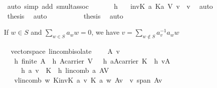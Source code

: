 \begin{isabellebody}
\ {\isacharparenleft}auto\ simp\ add{\isacharcolon}\ smult{\isacharunderscore}assoc{}{\isacharparenright}\isanewline
\ \ \ \ \isamarkupfalse%
\ {}\ h{}\ \isamarkupfalse%
\ {}{\isacharcolon}\ {\isachardoublequoteopen}{\isacharparenleft}inv\isactrlbsub K\isactrlesub \ a\ {\isasymotimes}\isactrlbsub K\isactrlesub a{\isacharparenright}\ {\isasymodot}\isactrlbsub V\isactrlesub \ v\ {\isacharequal}\ v{\isachardoublequoteclose}\ \isamarkupfalse%
\ auto\isanewline
\ \ \ \ \isamarkupfalse%
\ {}\ {}\ \isamarkupfalse%
\ {\isacharquery}thesis\ \isamarkupfalse%
\ auto\isanewline
\ \ \isamarkupfalse%
\isanewline
\ \ \isamarkupfalse%
\ {}\ {}\ \isamarkupfalse%
\ {\isacharquery}thesis\ \isamarkupfalse%
\ auto\isanewline
{}\isamarkupfalse%
%
\endisatagproof
{\isafoldproof}%
%
\isadelimproof
%
\endisadelimproof
%
\begin{isamarkuptext}%
If $w\in S$ and $\sum_{w\in S} a_ww=0$, we have $v=\sum_{w\not\in S}a_v^{-1}a_ww$%
\end{isamarkuptext}%
\isamarkuptrue%
\isamarkupfalse%
\ {\isacharparenleft}\ vectorspace{\isacharparenright}\ lincomb{\isacharunderscore}isolate{\isacharcolon}\ \isanewline
\ \ \ A\ v\isanewline
\ \ \ h{}{\isacharcolon}\ {\isachardoublequoteopen}finite\ A{\isachardoublequoteclose}\ \ h{}{\isacharcolon}\ {\isachardoublequoteopen}A{\isasymsubseteq}carrier\ V{\isachardoublequoteclose}\ \ \ h{}{\isacharcolon}\ {\isachardoublequoteopen}a{\isasymin}A{\isasymrightarrow}carrier\ K{\isachardoublequoteclose}\ \ h{}{\isacharcolon}\ {\isachardoublequoteopen}v{\isasymin}A{\isachardoublequoteclose}\isanewline
\ \ \ \ \ h{}{\isacharcolon}\ {\isachardoublequoteopen}a\ v\ {\isasymnoteq}\ {\isasymzero}\isactrlbsub K\isactrlesub {\isachardoublequoteclose}\ \ h{}{\isacharcolon}\ {\isachardoublequoteopen}lincomb\ a\ A{\isacharequal}{\isasymzero}\isactrlbsub V\isactrlesub {\isachardoublequoteclose}\isanewline
\ \ \ {\isachardoublequoteopen}v{\isacharequal}lincomb\ {\isacharparenleft}{\isasymlambda}w{\isachardot}\ {\isasymominus}\isactrlbsub K\isactrlesub {\isacharparenleft}inv\isactrlbsub K\isactrlesub \ {\isacharparenleft}a\ v{\isacharparenright}{\isacharparenright}\ {\isasymotimes}\isactrlbsub K\isactrlesub \ a\ w{\isacharparenright}\ {\isacharparenleft}A{\isacharminus}{\isacharbraceleft}v{\isacharbraceright}{\isacharparenright}{\isachardoublequoteclose}\ \ {\isachardoublequoteopen}v{\isasymin}\ span\ {\isacharparenleft}A{\isacharminus}{\isacharbraceleft}v{\isacharbraceright}{\isacharparenright}{\isachardoublequoteclose}\isanewline

\end{isabellebody}
